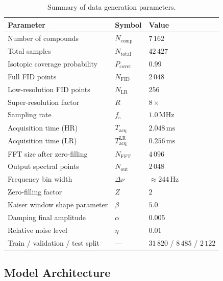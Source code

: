 \documentclass[12pt,a4paper]{report}
\begin{document}
\begin{table}[H]
  \centering
  \caption{Summary of data generation parameters.}
  \label{tab:data-summary}
  \renewcommand{\arraystretch}{1.08}
  \begin{tabular}{@{}p{}>{\centering\arraybackslash}p{}>{\centering\arraybackslash}p{}@{}}
    \toprule
    \textbf{Parameter} & \textbf{Symbol} & \textbf{Value} \\
    \midrule
    Number of compounds & $N_{\mathrm{comp}}$ & $7\,162$ \\
    Total samples & $N_{\mathrm{total}}$ & $42\,427$ \\
    Isotopic coverage probability & $P_{\mathrm{cover}}$ & $0.99$ \\
    Full FID points & $N_{\mathrm{FID}}$ & $2\,048$ \\
    Low-resolution FID points & $N_{\mathrm{LR}}$ & $256$ \\
    Super-resolution factor & $R$ & $8\times$ \\
    Sampling rate & $f_{\mathrm{s}}$ & $1.0\,\mathrm{MHz}$ \\
    Acquisition time (HR) & $T_{\mathrm{acq}}$ & $2.048\,\mathrm{ms}$ \\
    Acquisition time (LR) & $T_{\mathrm{acq}}^{\mathrm{LR}}$ & $0.256\,\mathrm{ms}$ \\
    FFT size after zero-filling & $N_{\mathrm{FFT}}$ & $4\,096$ \\
    Output spectral points & $N_{\mathrm{out}}$ & $2\,048$ \\
    Frequency bin width & $\Delta\nu$ & $\approx 244\,\mathrm{Hz}$ \\
    Zero-filling factor & $Z$ & $2$ \\
    Kaiser window shape parameter & $\beta$ & $5.0$ \\
    Damping final amplitude & $\alpha$ & $0.005$ \\
    Relative noise level & $\eta$ & $0.01$ \\
    Train / validation / test split & --- & $31\,820$ / $8\,485$ / $2\,122$ \\
    \bottomrule
  \end{tabular}
\end{table}

\subsection{Model Architecture}
\label{sec:model}
\end{document}
